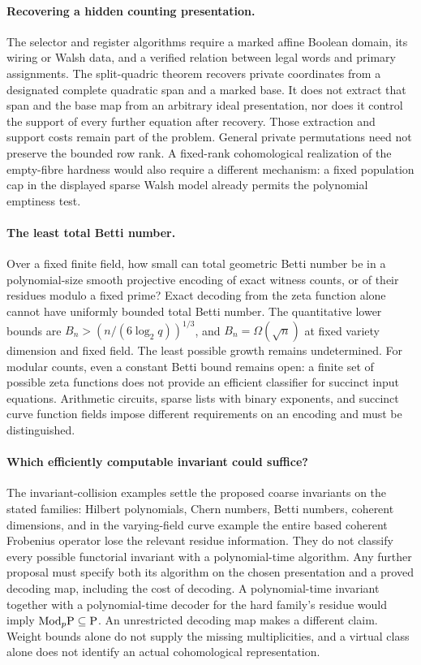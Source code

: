 \paragraph{Recovering a hidden counting presentation.}
The selector and register algorithms require a marked affine Boolean
domain, its wiring or Walsh data, and a verified relation between legal
words and primary assignments. The split-quadric theorem recovers private
coordinates from a designated complete quadratic span and a marked base.
It does not extract that span and the base map from an arbitrary ideal
presentation, nor does it control the support of every further equation
after recovery. Those extraction and support costs remain part of the
problem. General private permutations need not preserve the bounded row
rank. A fixed-rank cohomological realization of the empty-fibre hardness
would also require a different mechanism: a fixed population cap in the
displayed sparse Walsh model already permits the polynomial emptiness
test.

\paragraph{The least total Betti number.}
Over a fixed finite field, how small can total geometric Betti number be
in a polynomial-size smooth projective encoding of exact witness counts,
or of their residues modulo a fixed prime? Exact decoding from the zeta
function alone cannot have uniformly bounded total Betti number. The
quantitative lower bounds are
\(B_n> (n/(6\log_2q))^{1/3}\), and
\(B_n=\Omega(\sqrt n)\) at fixed variety dimension and fixed field.
The least possible growth remains undetermined. For modular counts,
even a constant Betti bound remains open: a finite set of possible zeta
functions does not provide an efficient classifier for succinct input
equations. Arithmetic circuits, sparse lists with binary exponents, and
succinct curve function fields impose different requirements on an
encoding and must be distinguished.

\paragraph{Which efficiently computable invariant could suffice?}
The invariant-collision examples settle the proposed coarse invariants
on the stated families: Hilbert polynomials, Chern numbers, Betti numbers,
coherent dimensions, and in the varying-field curve example the entire
based coherent Frobenius operator lose the relevant residue information.
They do not classify every possible functorial invariant with a
polynomial-time algorithm. Any further proposal must specify both its
algorithm on the chosen presentation and a proved decoding map, including
the cost of decoding. A polynomial-time invariant together with a
polynomial-time decoder for the hard family's residue would imply
\(\mathrm{Mod}_p\mathrm P\subseteq\mathrm P\). An unrestricted decoding map makes a
different claim. Weight
bounds alone do not supply the missing multiplicities, and a virtual
class alone does not identify an actual cohomological representation.
